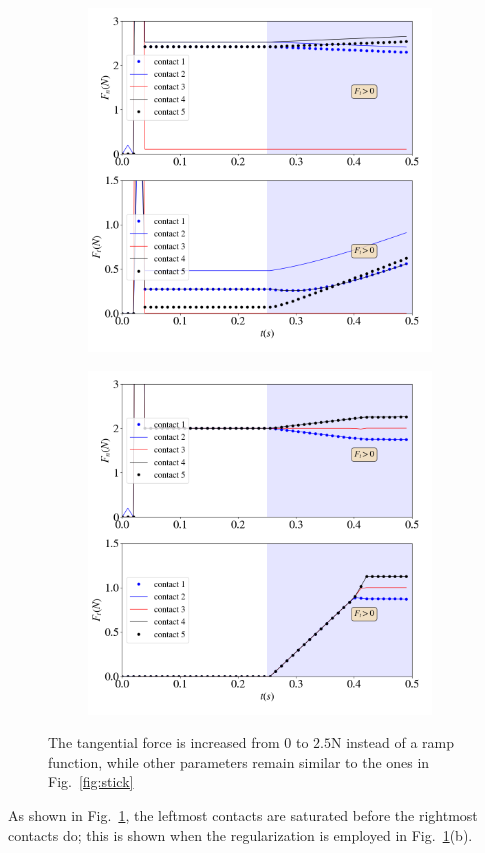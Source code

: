 \begin{itemize}
\begin{figure}[H]
\begin{subfigure}{0.48\columnwidth}
			\includegraphics[width=1.0\textwidth]{images/CD/slip_T.png}
		\end{subfigure}	
		\begin{subfigure}{0.48\columnwidth}	
			\centering
			\includegraphics[width=1.0\textwidth]{images/CD/slip_T_reg.png}
		\end{subfigure}	
		\caption{The tangential force is increased from 0 to $2.5$\si{N} instead of a ramp function, while other parameters remain similar to the ones in Fig.~\ref{fig:stick}}\label{fig:slip_T}
	\end{figure}
	As shown in Fig.~\ref{fig:slip_T}, the leftmost contacts are saturated before the rightmost contacts do; this is shown when the regularization is employed in Fig.~\ref{fig:slip_T}(b).
	

\end{itemize}
